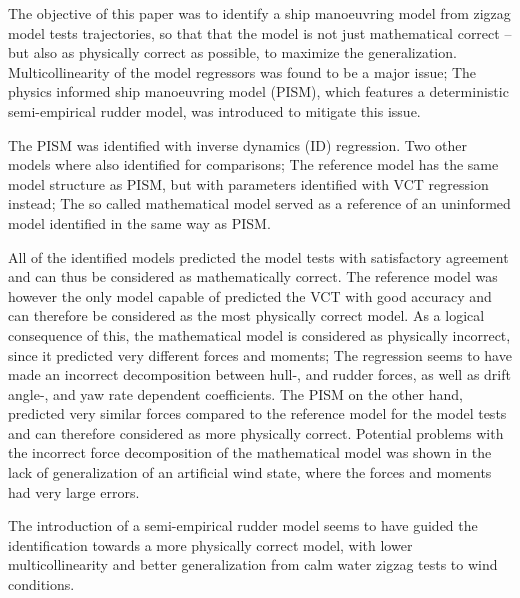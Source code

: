 The objective of this paper was to identify a ship manoeuvring model from zigzag model tests trajectories, so that that the model is not just mathematical correct -- but also as physically correct as possible, to maximize the generalization. Multicollinearity of the model regressors was found to be a major issue; The physics informed ship manoeuvring model (PISM), which features a deterministic semi-empirical rudder model, was introduced to mitigate this issue. 

The PISM was identified with inverse dynamics (ID) regression. Two other models where also identified for comparisons;
The reference model has the same model structure as PISM, but with parameters identified with VCT regression instead; The so called mathematical model served as a reference of an uninformed model identified in the same way as PISM.

All of the identified models predicted the model tests with satisfactory agreement and can thus be considered as mathematically correct.
The reference model was however the only model capable of predicted the VCT with good accuracy and can therefore be considered as the most physically correct model.
As a logical consequence of this, the mathematical model is considered as physically incorrect, since it predicted very different forces and moments; The regression seems to have made an incorrect decomposition between hull-, and rudder forces, as well as drift angle-, and yaw rate dependent coefficients.
The PISM on the other hand, predicted very similar forces compared to the reference model for the model tests and can therefore considered as more physically correct.
Potential problems with the incorrect force decomposition of the mathematical model was shown in the lack of generalization of an artificial wind state, where the forces and moments had very large errors.

The introduction of a semi-empirical rudder model seems to have guided the identification towards a more physically correct model, with lower multicollinearity and better generalization from calm water zigzag tests to wind conditions.

